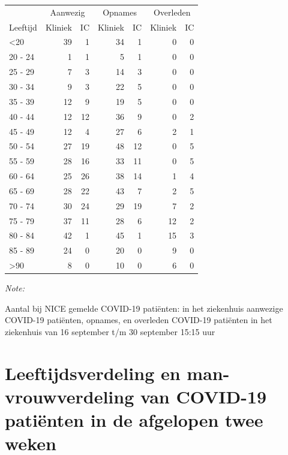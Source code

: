 \documentclass[
  english,
  man,floatsintext]{apa6}
\begin{document}
\begin{table}
\centering\begingroup\fontsize{10}{12}\selectfont

\begin{threeparttable}
\begin{tabular}{lrrrrrr}
\toprule
\multicolumn{1}{c}{ } & \multicolumn{2}{c}{Aanwezig} & \multicolumn{2}{c}{Opnames} & \multicolumn{2}{c}{Overleden} \\
\cmidrule(l{3pt}r{3pt}){2-3} \cmidrule(l{3pt}r{3pt}){4-5} \cmidrule(l{3pt}r{3pt}){6-7}
Leeftijd & Kliniek & IC & Kliniek & IC & Kliniek & IC\\
\midrule
<20 & 39 & 1 & 34 & 1 & 0 & 0\\
20 - 24 & 1 & 1 & 5 & 1 & 0 & 0\\
25 - 29 & 7 & 3 & 14 & 3 & 0 & 0\\
30 - 34 & 9 & 3 & 22 & 5 & 0 & 0\\
35 - 39 & 12 & 9 & 19 & 5 & 0 & 0\\
40 - 44 & 12 & 12 & 36 & 9 & 0 & 2\\
45 - 49 & 12 & 4 & 27 & 6 & 2 & 1\\
50 - 54 & 27 & 19 & 48 & 12 & 0 & 5\\
55 - 59 & 28 & 16 & 33 & 11 & 0 & 5\\
60 - 64 & 25 & 26 & 38 & 14 & 1 & 4\\
65 - 69 & 28 & 22 & 43 & 7 & 2 & 5\\
70 - 74 & 30 & 24 & 29 & 19 & 7 & 2\\
75 - 79 & 37 & 11 & 28 & 6 & 12 & 2\\
80 - 84 & 42 & 1 & 45 & 1 & 15 & 3\\
85 - 89 & 24 & 0 & 20 & 0 & 9 & 0\\
>90 & 8 & 0 & 10 & 0 & 6 & 0\\
\bottomrule
\end{tabular}
\begin{tablenotes}
\item \textit{Note: } 
\item Aantal bij NICE gemelde COVID-19 patiënten: in het ziekenhuis aanwezige COVID-19 patiënten, opnames, en overleden COVID-19 patiënten in het ziekenhuis van 16 september t/m 30 september 15:15 uur
\end{tablenotes}
\end{threeparttable}
\endgroup{}
\end{table}

\newpage

\hypertarget{leeftijdsverdeling-en-man-vrouwverdeling-van-covid-19-patiuxebnten-in-de-afgelopen-twee-weken}{%
\section{Leeftijdsverdeling en man-vrouwverdeling van COVID-19 patiënten in de afgelopen twee weken}\label{leeftijdsverdeling-en-man-vrouwverdeling-van-covid-19-patiuxebnten-in-de-afgelopen-twee-weken}}
\end{document}
